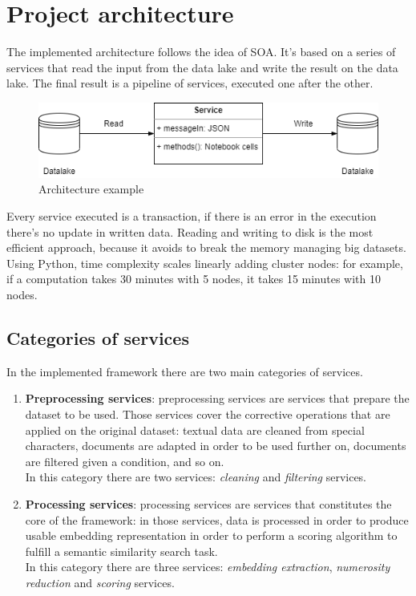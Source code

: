 \documentclass[\main/main.tex]{subfiles}
\begin{document}
\section{Project architecture}
The implemented architecture follows the idea of SOA. It's based on a series of services that read the input from the data lake and write the result on the data lake. The final result is a pipeline of services, executed one after the other.
\begin{figure}[H]
    \centering
    \includegraphics[scale=0.75]{images/architecture/architecture_service_example.png}
    \caption{Architecture example}
    \label{fig:architecture_example}
\end{figure}
Every service executed is a transaction, if there is an error in the execution there's no update in written data. Reading and writing to disk is the most efficient approach, because it avoids to break the memory managing big datasets. Using Python, time complexity scales linearly adding cluster nodes: for example, if a computation takes 30 minutes with 5 nodes, it takes 15 minutes with 10 nodes. 

\subsection{Categories of services}
In the implemented framework there are two main categories of services.
\begin{enumerate}
    \item \textbf{Preprocessing services}: preprocessing services are services that prepare the dataset to be used. Those services cover the corrective operations that are applied on the original dataset: textual data are cleaned from special characters, documents are adapted in order to be used further on, documents are filtered given a condition, and so on.  \\
    In this category there are two services: \emph{cleaning} and \emph{filtering} services.
    \item \textbf{Processing services}: processing services are services that constitutes the core of the framework: in those services, data is processed in order to produce usable embedding representation in order to perform a scoring algorithm to fulfill a semantic similarity search task. \\
    In this category there are three services: \emph{embedding extraction}, \emph{numerosity reduction} and \emph{scoring} services.
\end{enumerate}
\end{document}
